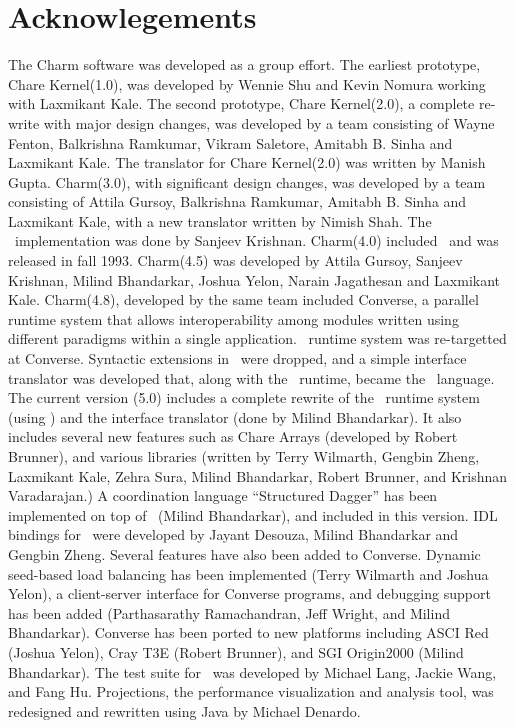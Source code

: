 \section*{Acknowlegements}

\large
The Charm software was developed as a group effort.  The earliest
prototype, Chare Kernel(1.0), was developed by Wennie Shu and Kevin
Nomura working with Laxmikant Kale.  The second prototype, Chare
Kernel(2.0), a complete re-write with major design changes, was
developed by a team consisting of Wayne Fenton, Balkrishna Ramkumar,
Vikram Saletore, Amitabh B. Sinha and Laxmikant Kale. The translator
for Chare Kernel(2.0) was written by Manish Gupta.  Charm(3.0), with
significant design changes, was developed by a team consisting of
Attila Gursoy, Balkrishna Ramkumar, Amitabh B.  Sinha and Laxmikant
Kale, with a new translator written by Nimish Shah.  The \charmpp\ 
implementation was done by Sanjeev Krishnan.  Charm(4.0) included
\charmpp\ and was released in fall 1993.  Charm(4.5) was developed by
Attila Gursoy, Sanjeev Krishnan, Milind Bhandarkar, Joshua Yelon,
Narain Jagathesan and Laxmikant Kale.  Charm(4.8), developed by the
same team included Converse, a parallel runtime system that allows
interoperability among modules written using different paradigms
within a single application. \charmpp\ runtime system was re-targetted
at Converse. Syntactic extensions in \charmpp\ were dropped, and a
simple interface translator was developed that, along with the \charmpp\
runtime, became the \charmpp\ language.  The current version (5.0)
includes a complete rewrite of the \charmpp\ runtime system (using \CC)
and the interface translator (done by Milind Bhandarkar).  It also
includes several new features such as Chare Arrays (developed by
Robert Brunner), and various libraries (written by Terry Wilmarth,
Gengbin Zheng, Laxmikant Kale, Zehra Sura, Milind Bhandarkar, Robert
Brunner, and Krishnan Varadarajan.) A coordination language
``Structured Dagger'' has been implemented on top of \charmpp\ (Milind
Bhandarkar), and included in this version.  IDL bindings for \charmpp\ 
were developed by Jayant Desouza, Milind Bhandarkar and Gengbin
Zheng. Several features have also been added to Converse. Dynamic
seed-based load balancing has been implemented (Terry Wilmarth and
Joshua Yelon), a client-server interface for Converse programs, and
debugging support has been added (Parthasarathy Ramachandran, Jeff
Wright, and Milind Bhandarkar).  Converse has been ported to new
platforms including ASCI Red (Joshua Yelon), Cray T3E (Robert
Brunner), and SGI Origin2000 (Milind Bhandarkar).  The test suite for
\charmpp\ was developed by Michael Lang, Jackie Wang, and Fang
Hu. Projections, the performance visualization and analysis tool, was
redesigned and rewritten using Java by Michael Denardo.

\normalsize
